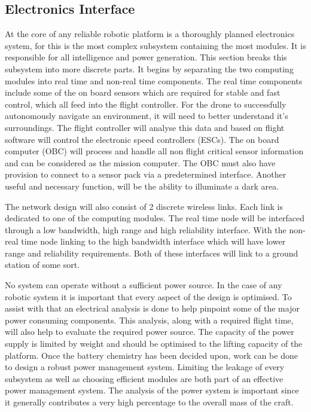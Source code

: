 		\subsection{Electronics Interface}
		At the core of any reliable robotic platform is a thoroughly planned electronics system, for \projectName this is the most complex subsystem containing the most modules. It is responsible for all intelligence and power generation. This section breaks this subsystem into more discrete parts. It begins by separating the two computing modules into real time and non-real time components. The real time components include some of the on board sensors which are required for stable and fast control, which all feed into the flight controller. For the drone to successfully autonomously navigate an environment, it will need to better understand it's surroundings. The flight controller will analyse this data and based on flight software will control the electronic speed controllers (ESCs). The on board computer (OBC) will process and handle all non flight critical sensor information and can be considered as the mission computer. The OBC must also have provision to connect to a sensor pack via a predetermined interface. Another useful and necessary function, will be the ability to illuminate a dark area. 
		
		The network design will also consist of 2 discrete wireless links. Each link is dedicated to one of the computing modules. The real time node will be interfaced through a low bandwidth, high range and high reliability interface. With the non-real time node linking to the high bandwidth interface which will have lower range and reliability requirements. Both of these interfaces will link to a ground station of some sort.
		
		No system can operate without a sufficient power source. In the case of any robotic system it is important that every aspect of the design is optimised. To assist with that an electrical analysis is done to help pinpoint some of the major power consuming components. This analysis, along with a required flight time, will also help to evaluate the required power source. The capacity of the power supply is limited by weight and should be optimised to the lifting capacity of the platform. Once the battery chemistry has been decided upon, work can be done to design a robust power management system. Limiting the leakage of every subsystem as well as choosing efficient modules are both part of an effective power management system. The analysis of the power system is important since it generally contributes a very high percentage to the overall mass of the craft.
		
